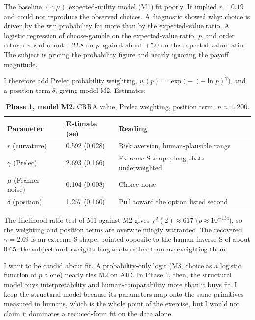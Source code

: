 \documentclass[11pt]{article}
\begin{document}
The baseline $(r, \mu)$ expected-utility model (M1) fit poorly. It implied $r = 0.19$ and could not
reproduce the observed choices. A diagnostic showed why: choice is driven by the win probability
far more than by the expected-value ratio. A logistic regression of choose-gamble on the
expected-value ratio, $p$, and order returns a $z$ of about $+22.8$ on $p$ against about $+5.0$ on
the expected-value ratio. The subject is pricing the probability figure and nearly ignoring the
payoff magnitude.

I therefore add Prelec probability weighting, $w(p) = \exp\!\big(-(-\ln p)^{\gamma}\big)$, and a
position term $\delta$, giving model M2. Estimates:

\begin{table}[h]
\centering
\small
\caption*{\small\textbf{Phase 1, model M2.} CRRA value, Prelec weighting, position term.
$n \approx 1{,}200$.}
\begin{tabular}{@{}l l l@{}}
\toprule
\textbf{Parameter} & \textbf{Estimate (se)} & \textbf{Reading} \\
\midrule
$r$ (curvature)       & 0.592 (0.028) & Risk aversion, human-plausible range \\
$\gamma$ (Prelec)     & 2.693 (0.166) & Extreme S-shape; long shots underweighted \\
$\mu$ (Fechner noise) & 0.104 (0.008) & Choice noise \\
$\delta$ (position)   & 1.257 (0.160) & Pull toward the option listed second \\
\bottomrule
\end{tabular}
\end{table}

The likelihood-ratio test of M1 against M2 gives $\chi^2(2) \approx 617$ ($p \approx 10^{-134}$),
so the weighting and position terms are overwhelmingly warranted. The recovered $\gamma = 2.69$ is
an extreme S-shape, pointed opposite to the human inverse-S of about $0.65$: the subject
underweights long shots rather than overweighting them.

I want to be candid about fit. A probability-only logit (M3, choice as a logistic function of $p$
alone) nearly ties M2 on AIC. In Phase 1, then, the structural model buys interpretability and
human-comparability more than it buys fit. I keep the structural model because its parameters map
onto the same primitives measured in humans, which is the whole point of the exercise, but I would
not claim it dominates a reduced-form fit on the data alone.
\end{document}
